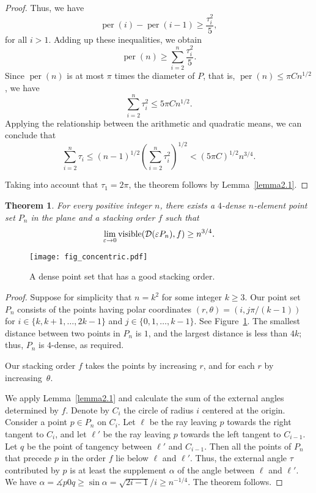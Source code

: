 \documentclass[11pt]{article}
\newtheorem{thm}{Theorem}             \newtheorem{lem}[thm]{Lemma}
\DeclareMathOperator{\vis}{\mathrm{visible}}
\DeclareMathOperator{\per}{\mathrm{per}}
\newcommand{\eps}{\varepsilon}
\begin{document}
\begin{proof}
Thus, we have $$\per(i)-\per(i-1)\ge \frac{\tau_i^2}{5},$$
for all $i>1$. Adding up these inequalities, we obtain
$$\per(n)\ge \sum_{i=2}^n\frac{\tau_i^2}{5}.$$
Since $\per(n)$ is at most $\pi$ times the diameter of $P$, that is, $\per(n)\le\pi C n^{1/2}$, we have
$$\sum_{i=2}^n \tau_i^2\le 5\pi C n^{1/2}.$$
Applying the relationship between the arithmetic and quadratic means, we can conclude that
$$\sum_{i=2}^n \tau_i\le (n-1)^{1/2}\left(\sum_{i=2}^n\tau_i^2\right)^{1/2}<(5\pi C)^{1/2}n^{3/4}.$$

Taking into account that $\tau_1=2\pi$, the theorem follows by Lemma~\ref{lemma2.1}.
\end{proof}

{
\renewcommand{\thethm}{3}
\begin{thm}For every positive integer $n$, there exists a $4$-dense $n$-element point set $P_n$ in the plane and a stacking order $f$ such that
$$\lim_{\eps\rightarrow 0}\vis({\cal D}(\eps P_n),f)\ge n^{3/4}.$$
\end{thm}
\addtocounter{thm}{-1}
}

\begin{figure}
\centerline{\texttt{[image: fig\_concentric.pdf]}}
\caption{\label{fig_concentric}A dense point set that has a good stacking order.}
\end{figure}

\begin{proof}
Suppose for simplicity that $n=k^2$ for some integer $k\ge3$. Our point set $P_n$ consists of the points having polar coordinates
$(r, \theta) = (i, j\pi/(k-1))$ for $i\in\{k,k+1,\ldots,2k-1\}$ and $j\in\{0,1,\ldots,k-1\}$. See Figure~\ref{fig_concentric}. The smallest
distance between two points in $P_n$ is $1$, and the largest distance
is less than $4k$; thus, $P_n$ is $4$-dense, as required.

Our stacking order $f$ takes the points by increasing $r$, and for each $r$ by increasing~$\theta$.

We apply Lemma~\ref{lemma2.1} and calculate the sum of
the external angles determined by $f$. Denote by $C_i$ the circle of radius $i$ centered at the origin.
Consider a point $p\in P_n$ on $C_i$. Let $\ell$ be the ray leaving $p$ towards the right tangent to $C_i$, and let $\ell'$ be the ray leaving $p$ towards the left tangent to $C_{i-1}$. Let $q$ be the point of tangency between $\ell'$ and $C_{i-1}$. Then all the points of $P_n$ that precede $p$ in the order $f$ lie below $\ell$ and $\ell'$. Thus, the external angle $\tau$ contributed by $p$ is at
least the supplement $\alpha$ of the angle between $\ell$ and $\ell'$. We have 
$\alpha=\measuredangle p0q\ge\sin\alpha=\sqrt{2i-1}/i\ge n^{-1/4}$.
The theorem follows.
\end{proof}
\end{document}
